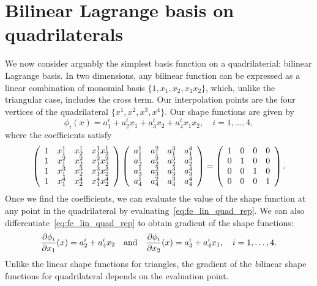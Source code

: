 \section{Bilinear Lagrange basis on quadrilaterals}
We now consider arguably the simplest basis function on a quadrilaterial: bilinear Lagrange basis.  In two dimensions, any bilinear function can be expressed as a linear combination of monomial basis $\{ 1, x_1, x_2, x_1 x_2 \}$, which, unlike the triangular case, includes the cross term. Our interpolation points are the four vertices of the quadrilateral $\{ x^1, x^2, x^3, x^4 \}$.  Our shape functions are given by 
\begin{equation}
  \phi_i(x) = a_1^i + a_2^i x_1 + a_3^i x_2 + a_4^i x_1 x_2, \quad i = 1,\dots,4,
  \label{eq:fe_lin_quad_rep}
\end{equation}
where the coefficients satisfy
\begin{equation*}
  \bmat{cccc}
  1 & x_1^1 & x_2^1 & x_1^1 x_2^1 \\
  1 & x_1^2 & x_2^2 & x_1^2 x_2^2 \\
  1 & x_1^3 & x_2^3 & x_1^3 x_2^3 \\
  1 & x_1^4 & x_2^4 & x_1^4 x_2^4 \\
  \emat
  \bmat{cccc}
  a_1^1 & a_1^2 & a_1^3 & a_1^4 \\
  a_2^1 & a_2^2 & a_2^3 & a_2^4 \\
  a_3^1 & a_3^2 & a_3^3 & a_3^4 \\
  a_4^1 & a_4^2 & a_4^3 & a_4^4 \\
  \emat
  =
  \bmat{cccc}
  1 & 0 & 0 & 0 \\
  0 & 1 & 0 & 0 \\
  0 & 0 & 1 & 0 \\
  0 & 0 & 0 & 1
  \emat.
\end{equation*}
Once we find the coefficients, we can evaluate the value of the shape function at any point in the quadrilateral by evaluating~\eqref{eq:fe_lin_quad_rep}. We can also differentiate~\eqref{eq:fe_lin_quad_rep} to obtain gradient of the shape functions:
\begin{equation*}
  \pp{\phi_i}{x_1}(x) = a_2^i + a_4^ix_2
  \quad \text{and} \quad
  \pp{\phi_i}{x_2}(x) = a_3^i + a_4^ix_1, \quad i = 1,\dots,4.
\end{equation*}
Unlike the linear shape functions for triangles, the gradient of the \emph{bi}linear shape functions for quadrilateral depends on the evaluation point.

